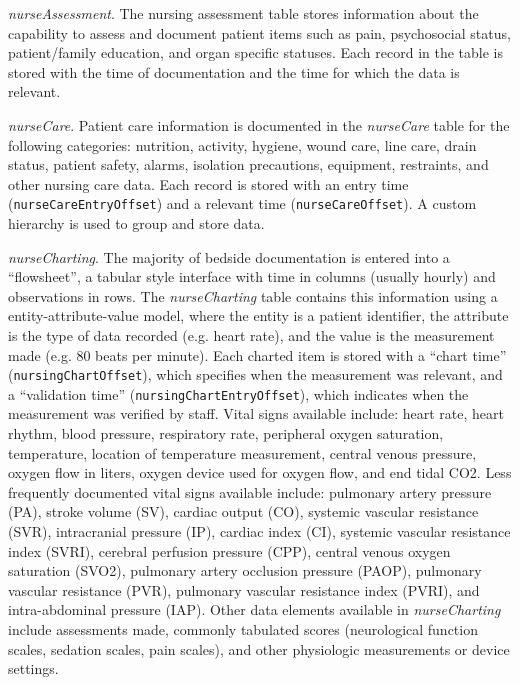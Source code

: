 \documentclass[english]{article}
\newcommand{\colname}[1]{\texttt{#1}}
\newcommand{\tblname}[1]{\emph{#1}}
\begin{document}
\tblname{nurseAssessment}. The nursing assessment table stores information about the capability to assess and document patient items such as pain, psychosocial status, patient/family education, and organ specific statuses. Each record in the table is stored with the time of documentation and the time for which the data is relevant.

\tblname{nurseCare}. Patient care information is documented in the \tblname{nurseCare} table for the following categories: nutrition, activity, hygiene, wound care, line care, drain status, patient safety, alarms, isolation precautions, equipment, restraints, and other nursing care data.
Each record is stored with an entry time (\colname{nurseCareEntryOffset}) and a relevant time (\colname{nurseCareOffset}). A custom hierarchy is used to group and store data.

\tblname{nurseCharting}. The majority of bedside documentation is entered into a ``flowsheet'', a tabular style interface with time in columns (usually hourly) and observations in rows. The \tblname{nurseCharting} table contains this information using a entity-attribute-value model, where the entity is a patient identifier, the attribute is the type of data recorded (e.g. heart rate), and the value is the measurement made (e.g. 80 beats per minute).
Each charted item is stored with a ``chart time'' (\colname{nursingChartOffset}), which specifies when the measurement was relevant, and a ``validation time'' (\colname{nursingChartEntryOffset}), which indicates when the measurement was verified by staff.
Vital signs available include: heart rate, heart rhythm, blood pressure, respiratory rate, peripheral oxygen saturation, temperature, location of temperature measurement, central venous pressure, oxygen flow in liters,  oxygen device used for oxygen flow, and end tidal CO2.
Less frequently documented vital signs available include: pulmonary artery pressure (PA), stroke volume (SV), cardiac output (CO), systemic vascular resistance (SVR), intracranial pressure (IP), cardiac index (CI), systemic vascular resistance index (SVRI), cerebral perfusion pressure (CPP), central venous oxygen saturation (SVO2),  pulmonary artery occlusion pressure (PAOP), pulmonary vascular resistance (PVR), pulmonary vascular resistance index (PVRI), and intra-abdominal pressure (IAP).
Other data elements available in \tblname{nurseCharting} include assessments made, commonly tabulated scores (neurological function scales, sedation scales, pain scales), and other physiologic measurements or device settings.
\end{document}
